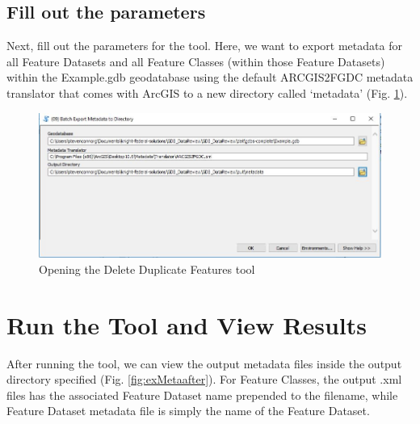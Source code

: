 \documentclass[openany]{book}
\theoremstyle{definition}
\theoremstyle{definition}
\theoremstyle{definition}
\theoremstyle{remark}
\begin{document}
\subsection{Fill out the parameters}\label{fill-out-the-parameters-9}

Next, fill out the parameters for the tool. Here, we want to export
metadata for all Feature Datasets and all Feature Classes (within those
Feature Datasets) within the Example.gdb geodatabase using the default
ARCGIS2FGDC metadata translator that comes with ArcGIS to a new
directory called `metadata' (Fig. \ref{fig:exMetaparams}).

\begin{figure}[H]

{\centering \includegraphics{figures/exMeta-params} 

}

\caption{Opening the Delete Duplicate Features tool}\label{fig:exMetaparams}
\end{figure}

\section{Run the Tool and View
Results}\label{run-the-tool-and-view-results-9}

After running the tool, we can view the output metadata files inside the
output directory specified (Fig. \ref{fig:exMetaafter}). For Feature
Classes, the output .xml files has the associated Feature Dataset name
prepended to the filename, while Feature Dataset metadata file is simply
the name of the Feature Dataset.
\end{document}
